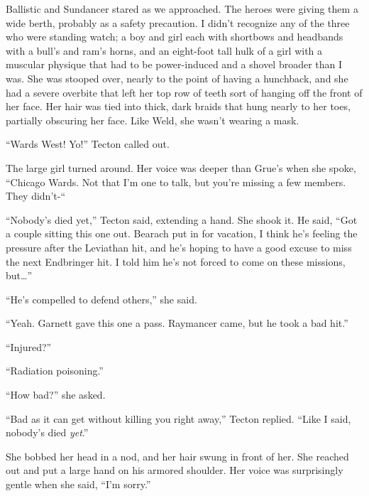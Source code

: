 Ballistic and Sundancer stared as we approached.  The heroes were giving them a wide berth, probably as a safety precaution.  I didn't recognize any of the three who were standing watch; a boy and girl each with shortbows and headbands with a bull's and ram's horns, and an eight-foot tall hulk of a girl with a muscular physique that had to be power-induced and a shovel broader than I was.  She was stooped over, nearly to the point of having a hunchback, and she had a severe overbite that left her top row of teeth sort of hanging off the front of her face.  Her hair was tied into thick, dark braids that hung nearly to her toes, partially obscuring her face.  Like Weld, she wasn't wearing a mask.



``Wards West!  Yo!'' Tecton called out.



The large girl turned around.  Her voice was deeper than Grue's when she spoke, ``Chicago Wards.  Not that I'm one to talk, but you're missing a few members.  They didn't-``



``Nobody's died yet,'' Tecton said, extending a hand.  She shook it.  He said, ``Got a couple sitting this one out.  Bearach put in for vacation, I think he's feeling the pressure after the Leviathan hit, and he's hoping to have a good excuse to miss the next Endbringer hit.  I told him he's not forced to come on these missions, but\ldots''



``He's compelled to defend others,'' she said.



``Yeah.  Garnett gave this one a pass.  Raymancer came, but he took a bad hit.''



``Injured?''



``Radiation poisoning.''



``How bad?'' she asked.



``Bad as it can get without killing you right away,'' Tecton replied.  ``Like I said, nobody's died \emph{yet}.''



She bobbed her head in a nod, and her hair swung in front of her.  She reached out and put a large hand on his armored shoulder.  Her voice was surprisingly gentle when she said, ``I'm sorry.''



